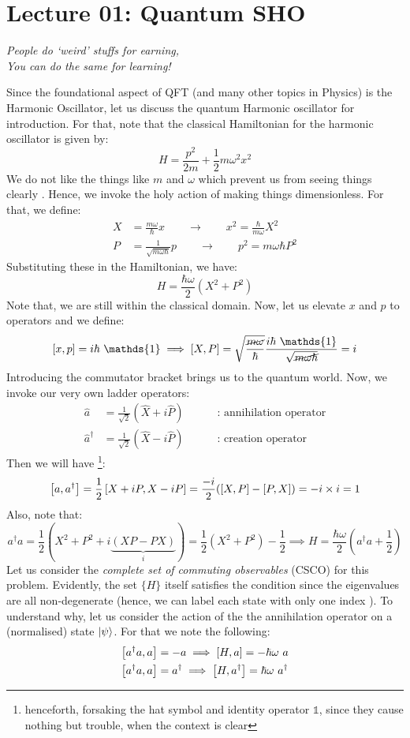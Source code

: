 \section*{Lecture 01: Quantum SHO}
\begin{center}
    \textit{People do `weird' stuffs for earning,\\
    You can do the same for learning!}
\end{center}
Since the foundational aspect of QFT (and many other topics in Physics) is the Harmonic Oscillator, let us discuss the quantum Harmonic oscillator for introduction. For that, note that the classical Hamiltonian for the harmonic oscillator is given by:
$$H = \frac{p^2}{2m}+\frac{1}{2}m\omega^2x^2 $$
We do not like the things like $m$ and $\omega$ which prevent us from seeing things clearly . Hence, we invoke the holy action of making things dimensionless. For that, we define:
\begin{align*}
    X &= \frac{m\omega}{\hbar}x \qquad \longrightarrow\qquad x^2 = \frac{\hbar}{m\omega}X^2  \\
    P &=\frac{1}{\sqrt{m\omega\hbar}}p \qquad \longrightarrow\qquad p^2 = m\omega \hbar P^2
\end{align*}
Substituting these in the Hamiltonian, we have: 
$$H = \frac{\hbar\omega}{2}(X^2+P^2)$$
Note that, we are still within the classical domain. Now, let us elevate $x$ and $p$ to operators and we define:
$$\comtr{x}{p}=i\hbar\ \mathds{1} \implies \comtr{X}{P} =\sqrt{ \frac{\cancel{m\omega}}{{\hbar}}}\frac{i\hbar \ \mathds{1}}{\sqrt{\cancel{m\omega\hbar}}} = i$$
Introducing the commutator bracket brings us to the quantum world. Now, we invoke our very own ladder operators:
\begin{align*}
    \hat{a} &= \frac{1}{\sqrt{2}}(\hat{X}+ i\hat{P})\qquad \quad \text{: annihilation operator}\\
    \hat{a}^{\dagger} &= \frac{1}{\sqrt{2}}(\hat{X}- i\hat{P})\qquad \quad \text{: creation operator}
\end{align*}
Then we will have \footnote{henceforth, forsaking the hat symbol and identity operator $\mathds{1}$, since they cause nothing but trouble, when the context is clear}:
$$\left[ a, a^\dagger \right] = \frac{1}{2}\left[ X +iP, X-iP \right] = \frac{-i}{2}\qty(\left[ X, P \right]-\left[ P, X \right]) = -i\times i = 1$$
Also, note that:
$$a^\dagger a = \frac{1}{2}(X^2+P^2+i\underbrace{(XP-PX)}_{i})= \frac{1}{2}(X^2+P^2)-\frac{1}{2}\implies H = \frac{\hbar\omega}{2}(a^\dagger a +\frac{1}{2})$$
Let us consider the \textit{complete set of commuting observables} (CSCO) for this problem. Evidently, the set $\{H\}$ itself satisfies the condition since the eigenvalues are all non-degenerate (hence, we can label each state with only one index ). To understand why, let us consider the action of the the annihilation operator on a (normalised) state $\ket{\psi}$. For that we note the following:
\begin{align*}
    \left[ a^\dagger a, a \right] &= -a \implies \left[ H, a \right] = -\hbar\omega \ a\\
\left[ a^\dagger a, a \right] &= a^\dagger \implies \left[ H, a^\dagger \right] = \hbar\omega \ a^\dagger
\end{align*}

